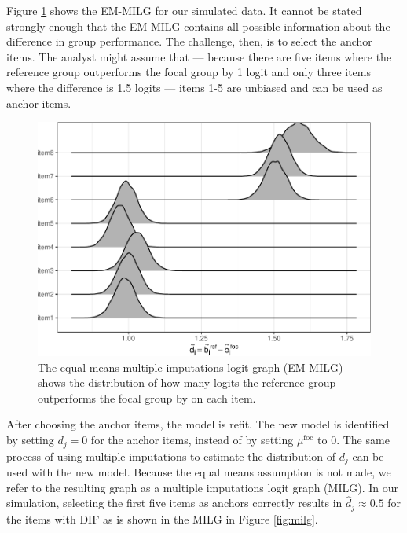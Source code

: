 \documentclass[
  11pt,
]{article}
\begin{document}
Figure \ref{fig:emmilg} shows the EM-MILG for our simulated data. It cannot be stated strongly enough that the EM-MILG contains all possible information about the difference in group performance. The challenge, then, is to select the anchor items. The analyst might assume that --- because there are five items where the reference group outperforms the focal group by 1 logit and only three items where the difference is 1.5 logits --- items 1-5 are unbiased and can be used as anchor items.

\begin{figure}[H]

{\centering \includegraphics[width=0.7\linewidth]{paper_files/figure-latex/emmilg-1} 

}

\caption{The equal means multiple imputations logit graph (EM-MILG) shows the distribution of how many logits the reference group outperforms the focal group by on each item.}\label{fig:emmilg}
\end{figure}

After choosing the anchor items, the model is refit. The new model is identified by setting \(d_j = 0\) for the anchor items, instead of by setting \(\mu^\text{foc}\) to \(0\). The same process of using multiple imputations to estimate the distribution of \(d_j\) can be used with the new model. Because the equal means assumption is not made, we refer to the resulting graph as a multiple imputations logit graph (MILG). In our simulation, selecting the first five items as anchors correctly results in \(\hat d_j \approx 0.5\) for the items with DIF as is shown in the MILG in Figure \ref{fig:milg}.
\end{document}
